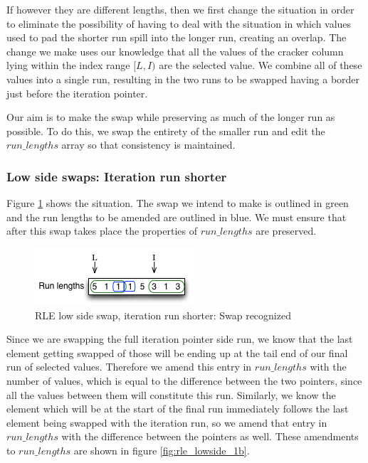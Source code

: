 If however they are different lengths, then we first change the situation in order to eliminate the possibility of having to deal with the situation in which values used to pad the shorter run spill into the longer run, creating an overlap. The change we make uses our knowledge that all the values of the cracker column lying within the index range $[L, I)$ are the selected value. We combine all of these values into a single run, resulting in the two runs to be swapped having a border just before the iteration pointer.

Our aim is to make the swap while preserving as much of the longer run as possible. To do this, we swap the entirety of the smaller run and edit the $run\_lengths$ array so that consistency is maintained.

\subsubsection{Low side swaps: Iteration run shorter}

Figure \ref{fig:rle_lowside_1a} shows the situation. The swap we intend to make is outlined in green and the run lengths to be amended are outlined in blue. We must ensure that after this swap takes place the properties of $run\_lengths$ are preserved.

\begin{figure}[H]
  \centering
  \includegraphics[]{images/d14_rle_lowside_1a}
  \caption{RLE low side swap, iteration run shorter: Swap recognized}
  \label{fig:rle_lowside_1a}
\end{figure}

Since we are swapping the full iteration pointer side run, we know that the last element getting swapped of those will be ending up at the tail end of our final run of selected values. Therefore we amend this entry in $run\_lengths$ with the number of values, which is equal to the difference between the two pointers, since all the values between them will constitute this run. Similarly, we know the element which will be at the start of the final run immediately follows the last element being swapped with the iteration run, so we amend that entry in $run\_lengths$ with the difference between the pointers as well. These amendments to $run\_lengths$ are shown in figure \ref{fig:rle_lowside_1b}.

